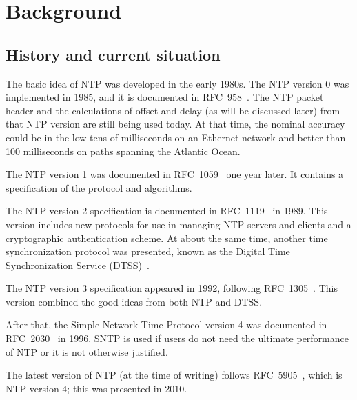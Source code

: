 
\chapter{Background}

\section{History and current situation}%
\label{sec:history_and_current_situation}
The basic idea of NTP was developed in the early 1980s. The NTP version 0 was
implemented in 1985, and it is documented in RFC~958~\cite{rfc958}. 
The NTP packet header and the calculations of offset and delay (as will be
discussed later) from that NTP version are still being used today. At that
time, the nominal accuracy could be in the low tens of milliseconds on an
Ethernet network and better than 100 milliseconds on paths spanning the
Atlantic Ocean.

The NTP version 1 was documented in RFC~1059~\cite{rfc1059} one year later. It
contains a specification of the protocol and algorithms.

The NTP version 2 specification is documented in RFC~1119~\cite{rfc1119} in 1989.
This version
includes new protocols for use in managing NTP servers and clients and a
cryptographic authentication scheme.
At about the same time, another time synchronization protocol was presented,
known as the Digital Time Synchronization Service (DTSS)~\cite{DTSS}.

The NTP version 3 specification appeared in 1992, following
RFC~1305~\cite{rfc1305}. This version combined the good ideas from both NTP and
DTSS\null.

After that, the Simple Network Time Protocol version 4 was documented in
RFC~2030~\cite{rfc2030}
in 1996. SNTP is used if users do not need the ultimate performance of NTP or
it is not otherwise justified.

The latest version of NTP (at the time of writing) follows
RFC~5905~\cite{rfc5905}, which is NTP version 4; this was presented in 2010.


